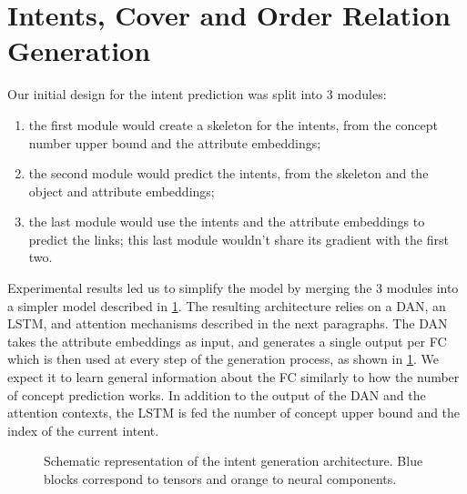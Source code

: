 \section{Intents, Cover and Order Relation Generation}\label{sec:intent-generation}

Our initial design for the intent prediction was split into 3 modules:
\begin{enumerate}
    \item the first module would create a skeleton for the intents, from the concept number upper bound and the attribute embeddings;
    \item the second module would predict the intents, from the skeleton and the object and attribute embeddings;
    \item the last module would use the intents and the attribute embeddings to predict the links; this last module wouldn't share its gradient with the first two.
\end{enumerate}

Experimental results led us to simplify the model by merging the 3 modules into a simpler model described in \cref{fig:fcat}.
The resulting architecture relies on a DAN, an LSTM, and attention mechanisms described in the next paragraphs.
The DAN takes the attribute embeddings as input, and generates a single output per FC which is then used at every step of the generation process, as shown in \cref{fig:fcat}.
We expect it to learn general information about the FC similarly to how the number of concept prediction works.
In addition to the output of the DAN and the attention contexts, the LSTM is fed the number of concept upper bound and the index of the current intent.

\begin{figure}
    \centering
    \caption{Schematic representation of the intent generation architecture. Blue blocks correspond to tensors and orange to neural components.}
    \label{fig:fcat}
\end{figure}

